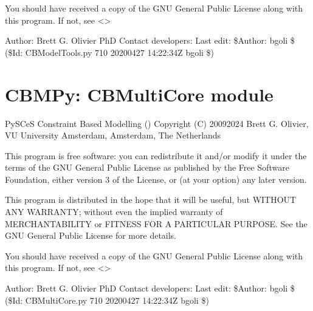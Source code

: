 \documentclass[letterpaper,10pt,english]{sphinxmanual}
\begin{document}
\sphinxAtStartPar
You should have received a copy of the GNU General Public License
along with this program.  If not, see \textless{}\textgreater{}

\sphinxAtStartPar
Author: Brett G. Olivier PhD
Contact developers: 
Last edit: \$Author: bgoli \$ (\$Id: CBModelTools.py 710 2020\sphinxhyphen{}04\sphinxhyphen{}27 14:22:34Z bgoli \$)
\label{\detokenize{modules_doc:module-cbmpy.CBMultiCore}}

\section{CBMPy: CBMultiCore module}
\label{\detokenize{modules_doc:cbmpy-cbmulticore-module}}
\sphinxAtStartPar
PySCeS Constraint Based Modelling ()
Copyright (C) 2009\sphinxhyphen{}2024 Brett G. Olivier, VU University Amsterdam, Amsterdam, The Netherlands

\sphinxAtStartPar
This program is free software: you can redistribute it and/or modify
it under the terms of the GNU General Public License as published by
the Free Software Foundation, either version 3 of the License, or
(at your option) any later version.

\sphinxAtStartPar
This program is distributed in the hope that it will be useful,
but WITHOUT ANY WARRANTY; without even the implied warranty of
MERCHANTABILITY or FITNESS FOR A PARTICULAR PURPOSE.  See the
GNU General Public License for more details.

\sphinxAtStartPar
You should have received a copy of the GNU General Public License
along with this program.  If not, see \textless{}\textgreater{}

\sphinxAtStartPar
Author: Brett G. Olivier PhD
Contact developers: 
Last edit: \$Author: bgoli \$ (\$Id: CBMultiCore.py 710 2020\sphinxhyphen{}04\sphinxhyphen{}27 14:22:34Z bgoli \$)
\end{document}
